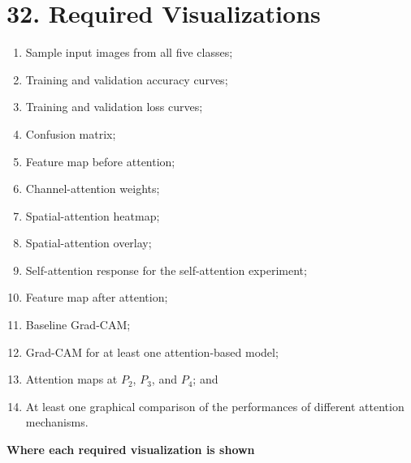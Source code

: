 \documentclass[10pt]{article}
\begin{document}
\section*{32. Required Visualizations}

\begin{enumerate}

\item Sample input images from all five classes;

\item Training and validation accuracy curves;

\item Training and validation loss curves;

\item Confusion matrix;

\item Feature map before attention;

\item Channel-attention weights;

\item Spatial-attention heatmap;

\item Spatial-attention overlay;

\item Self-attention response for the self-attention experiment;

\item Feature map after attention;

\item Baseline Grad-CAM;

\item Grad-CAM for at least one attention-based model;

\item Attention maps at $P_2$, $P_3$, and $P_4$; and

\item At least one graphical comparison of the performances of different
attention mechanisms.

\end{enumerate}

\medskip
\textbf{Where each required visualization is shown}
\end{document}
